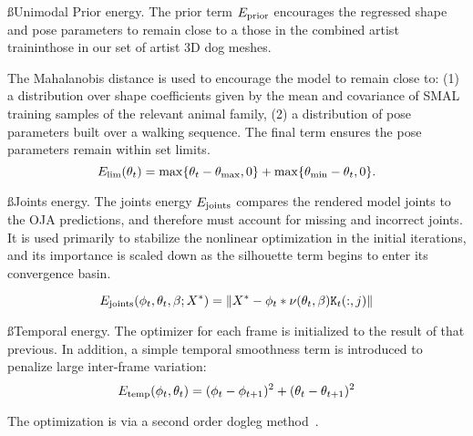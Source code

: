 \ss{Unimodal Prior energy.}
The prior term $E_\textrm{prior}$ encourages the regressed shape and pose parameters to remain close to a those in the combined artist traininthose in our set of artist 3D dog meshes.



The Mahalanobis distance is used to encourage the model to remain close to: (1) a distribution over shape coefficients given by the mean and covariance of SMAL training samples of the relevant animal family, (2) a distribution of pose parameters built over a walking sequence. The final term ensures the pose parameters remain within set limits.
\begin{equation}
E_\textrm{lim}(\theta_{t}) = \max\{\theta_{t} - \theta_{\text{max}}, 0\} + \max\{\theta_{\text{min}} - \theta_{t}, 0\}.
\end{equation}

\ss{Joints energy.}
The joints energy $E_\textrm{joints}$ compares the rendered model joints to the OJA predictions, and therefore must account for missing and incorrect joints.  It is used primarily to stabilize the nonlinear optimization in the initial iterations, and its importance is scaled down as the silhouette term begins to enter its convergence basin.

\begin{equation}
E_\textrm{joints}(\phi_{t}, \theta_{t}, \beta; X^{*}) = 
\lVert X^{*} - \phi_{t} * \nu(\theta_{t},\beta)\mathtt{K}_{t}(:,j) \rVert
\end{equation}

\ss{Temporal energy.}
The optimizer for each frame is initialized to the result of that previous. In addition, a simple temporal smoothness term is introduced to penalize large inter-frame variation:
\begin{equation}
E_\textrm{temp}(\phi_{t}, \theta_{t}) = (\phi_{t} - \phi_{t+1})^2 + (\theta_{t} - \theta_{t+1})^2
\end{equation}\label{eq:temporal-energy}

The optimization is via a second order dogleg method~\cite{lourakis2005levenberg}.
